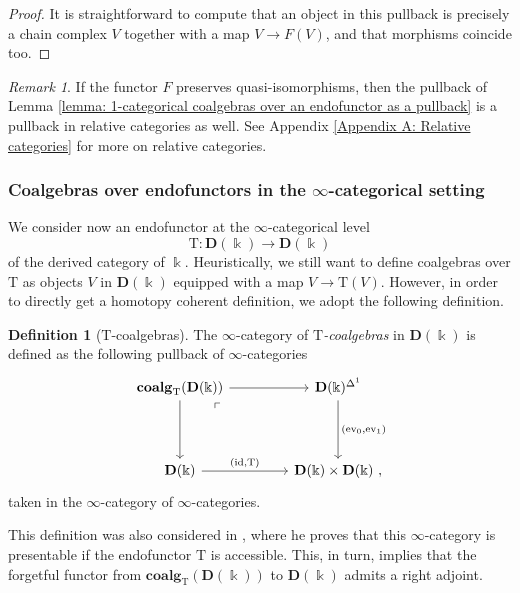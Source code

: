 \documentclass[a4paper,12pt]{amsart}
\theoremstyle{plain}
\theoremstyle{definition}
\newtheorem{definition}[theorem]{Definition}%
\theoremstyle{remark}
\newtheorem{remark}[theorem]{\sc Remark}%
\newcommand{\kk}{\Bbbk}
\begin{document}
\begin{proof}
It is straightforward to compute that an object in this pullback is precisely a chain complex $V$ together with a map $V \longrightarrow F(V)$, and that morphisms coincide too. 
\end{proof}

\begin{remark}
    If the functor $F$ preserves quasi-isomorphisms, then the pullback of Lemma \ref{lemma: 1-categorical coalgebras over an endofunctor as a pullback} is a pullback in relative categories as well. See Appendix \ref{Appendix A: Relative categories} for more on relative categories. 
\end{remark}

\subsubsection{Coalgebras over endofunctors in the $\infty$-categorical setting} We consider now an endofunctor at the $\infty$-categorical level
\[
\mathrm{T}: \mathbf{D}(\kk) \longrightarrow \mathbf{D}(\kk)
\]
of the derived category of $\kk$. Heuristically, we still want to define coalgebras over $\mathrm{T}$ as objects $V$ in $\mathbf{D}(\kk)$ equipped with a map $V \longrightarrow \mathrm{T}(V)$. However, in order to directly get a homotopy coherent definition, we adopt the following definition. 

\begin{definition}[$\mathrm{T}$-coalgebras]\label{definition: infinity categorical coalgebras over an endofunctor}
The $\infty$-category of $\mathrm{T}$\textit{-coalgebras} in $\mathbf{D}(\kk)$ is defined as the following pullback of $\infty$-categories
\[
\begin{tikzcd}[column sep=3.5pc,row sep=3.5pc]
\mathbf{coalg}_{\mathrm{T}}(\mathbf{D}(\kk)) \arrow[r] \arrow[d] \arrow[dr, phantom, "\ulcorner", very near start]
& \mathbf{D}(\kk)^{\Delta^1} \arrow[d,"{(\mathrm{ev}_0,\mathrm{ev}_1)}"]  \\
 \mathbf{D}(\kk) \arrow[r,"{(\mathrm{id}, \mathrm{T})}"]
& \mathbf{D}(\kk) \times  \mathbf{D}(\kk)~,
\end{tikzcd}
\]
taken in the $\infty$-category of $\infty$-categories. 
\end{definition}

This definition was also considered in \cite[Section 7]{heuts2024}, where he proves that this $\infty$-category is presentable if the endofunctor $\mathrm{T}$ is accessible. This, in turn, implies that the forgetful functor from $\mathbf{coalg}_{\mathrm{T}}(\mathbf{D}(\kk))$ to $\mathbf{D}(\kk)$ admits a right adjoint.
\end{document}
